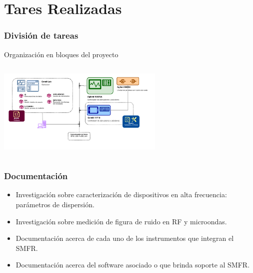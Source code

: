 \documentclass[xcolor=pdftext, table]{beamer}
\begin{document}
	\section{Tares Realizadas}
	
		\begin{frame}	
			\frametitle{División de tareas}

			\begin{block}{Organización en bloques del proyecto}		
				
			\begin{columns}			

				\begin{column}{8cm}			
					\begin{center}
						\includegraphics[width=8cm]{Imagenes/SystemMainDiagram.pdf}		
					\end{center}
				\end{column}
			
				\begin{column}{4cm}					
				\end{column}				
			\end{columns}
			
		\end{block}	
		
	\end{frame}

	\begin{frame}
		\frametitle{Documentación}
		
		\begin{itemize}
		 	\item Investigación sobre caracterización de dispositivos en alta frecuencia: parámetros de dispersión.
		 	\item Investigación sobre medición de figura de ruido en RF y microondas.
		 	\item Documentación acerca de cada uno de los instrumentos que integran el SMFR.
		 	\item Documentación acerca del software asociado o que brinda soporte al SMFR.				
		 \end{itemize}		

	\end{frame}
\end{document}
